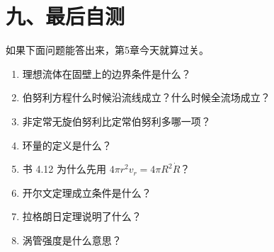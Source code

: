 \documentclass[11pt,a4paper]{ctexart}
\begin{document}
\section*{九、最后自测}

如果下面问题能答出来，第5章今天就算过关。

\begin{enumerate}
  \item 理想流体在固壁上的边界条件是什么？
  \item 伯努利方程什么时候沿流线成立？什么时候全流场成立？
  \item 非定常无旋伯努利比定常伯努利多哪一项？
  \item 环量的定义是什么？
  \item 书 4.12 为什么先用 \(4\pi r^2v_r=4\pi R^2\dot R\)？
  \item 开尔文定理成立条件是什么？
  \item 拉格朗日定理说明了什么？
  \item 涡管强度是什么意思？
\end{enumerate}
\end{document}
